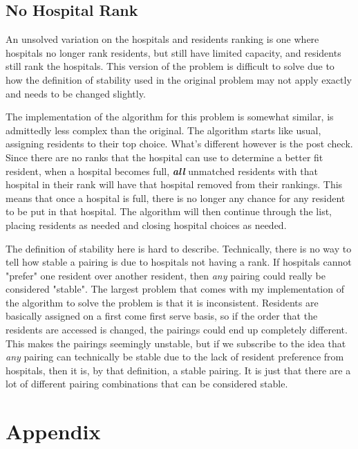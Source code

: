 \documentclass[letterpaper, 10pt,DIV=13]{scrartcl}
\numberwithin{equation}{section} %
\numberwithin{figure}{section} %
\numberwithin{table}{section} %
\begin{document}
\subsection{No Hospital Rank}
An unsolved variation on the hospitals and residents ranking is one where hospitals no longer rank residents, but still have limited capacity, and residents still rank the hospitals. This version of the problem is difficult to solve due to how the definition of stability used in the original problem may not apply exactly and needs to be changed slightly.

The implementation of the algorithm for this problem is somewhat similar, is admittedly less complex than the original. The algorithm starts like usual, assigning residents to their top choice. What's different however is the post check. Since there are no ranks that the hospital can use to determine a better fit resident, when a hospital becomes full, \textbf{\textit{all}} unmatched residents with that hospital in their rank will have that hospital removed from their rankings. This means that once a hospital is full, there is no longer any chance for any resident to be put in that hospital. The algorithm will then continue through the list, placing residents as needed and closing hospital choices as needed.

The definition of stability here is hard to describe. Technically, there is no way to tell how stable a pairing is due to hospitals not having a rank. If hospitals cannot "prefer" one resident over another resident, then \textit{any} pairing could really be considered "stable". The largest problem that comes with my implementation of the algorithm to solve the problem is that it is inconsistent. Residents are basically assigned on a first come first serve basis, so if the order that the residents are accessed is changed, the pairings could end up completely different. This makes the pairings seemingly unstable, but if we subscribe to the idea that \textit{any} pairing can technically be stable due to the lack of resident preference from hospitals, then it is, by that definition, a stable pairing. It is just that there are a lot of different pairing combinations that can be considered stable.
\pagebreak


\section{Appendix}
\end{document}
